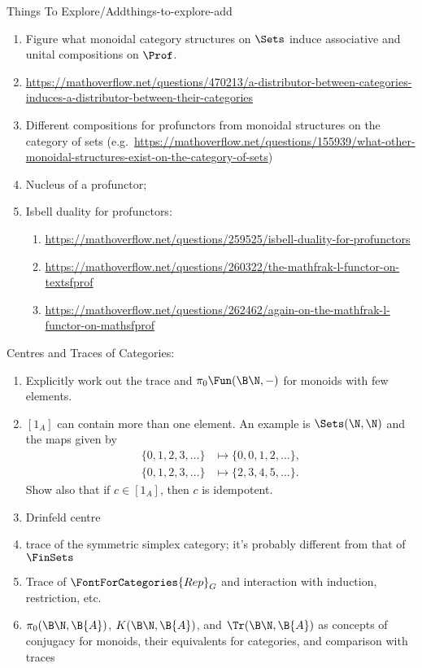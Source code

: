 \begin{remark}{Things To Explore/Add}{things-to-explore-add}
\begin{enumerate}
            Is $\Delta_{\emptyset}$ a unit?
        \item Figure what monoidal category structures on $\Sets$ induce associative and unital compositions on $\Prof$.
        \item \url{https://mathoverflow.net/questions/470213/a-distributor-between-categories-induces-a-distributor-between-their-categories}
        \item Different compositions for profunctors from monoidal structures on the category of sets (e.g.\ \url{https://mathoverflow.net/questions/155939/what-other-monoidal-structures-exist-on-the-category-of-sets})
        \item Nucleus of a profunctor;
        \item Isbell duality for profunctors:
            \begin{enumerate}
                \item \url{https://mathoverflow.net/questions/259525/isbell-duality-for-profunctors}
                \item \url{https://mathoverflow.net/questions/260322/the-mathfrak-l-functor-on-textsfprof}
                \item \url{https://mathoverflow.net/questions/262462/again-on-the-mathfrak-l-functor-on-mathsfprof}
            \end{enumerate}
    \end{enumerate}
    Centres and Traces of Categories:
    \begin{enumerate}
        \item Explicitly work out the trace and $\pi_{0}\Fun(\B\N,-)$ for monoids with few elements.
        \item $[1_{A}]$ can contain more than one element. An example is $\Sets(\N,\N)$ and the maps given by
            \begin{align*}
                \{0,1,2,3,\ldots\} &\mapsto \{0,0,1,2,\ldots\},\\
                \{0,1,2,3,\ldots\} &\mapsto \{2,3,4,5,\ldots\}.
            \end{align*}
            Show also that if $c\in[1_{A}]$, then $c$ is idempotent.
        \item Drinfeld centre
        \item trace of the symmetric simplex category; it's probably different from that of $\FinSets$
        \item Trace of $\FontForCategories{Rep}_{G}$ and interaction with induction, restriction, etc.
        \item $\pi_{0}(\B\N,\B{A})$, $K(\B\N,\B{A})$, and $\Tr(\B\N,\B{A})$ as concepts of conjugacy for monoids, their equivalents for categories, and comparison with traces

\end{enumerate}
\end{remark}
